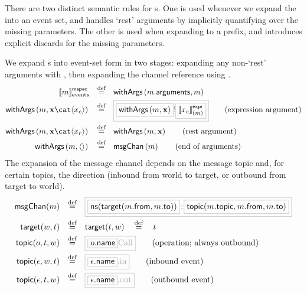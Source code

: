 There are two distinct semantic rules for \mmessagespec s.  One is used whenever
we expand the \mmessagespec{} into an event set, and handles `rest' arguments
by implicitly quantifying over the missing parameters.  The other is used when
expanding to a prefix, and introduces explicit discards for the missing
parameters.  

\begin{defn}

We expand \mmessagespec s into event-set form in two stages: expanding
any non-`rest' arguments with , then expanding the channel
reference using .
%
\begin{align*}
	\emspecsema{\amspec}
\quad\defeq\quad&
\funcname{withArgs}\left(\field{\amspec}{arguments}, \amspec\right)
\\
	\funcname{withArgs}\left(\amspec, \anarglist\cat\langle\anexprarg\rangle\right)
\quad\defeq\quad&
\tlang{
	\olang{\funcname{withArgs}\left(\amspec, \anarglist\right)}
	!\olang{\exprsema{\anexprarg}{\amspec}}
}
\tag{expression argument}
\\
	\funcname{withArgs}\left(\amspec, \anarglist\cat\langle\arestarg\rangle\right)
\quad\defeq\quad&
	\funcname{withArgs}\left(\amspec, \anarglist\right)
\tag{rest argument}
\\
	\funcname{withArgs}\left(\amspec, \langle\rangle\right)
\quad\defeq\quad&
	\funcname{msgChan}\left(\amspec\right)
\tag{end of arguments}
\end{align*}
The expansion of the message channel
depends on the message topic
and, for certain topics, the direction (inbound from world to target, or
outbound from target to world).
\newcommand{\nsOf}[1]{\mathsf{ns}(#1)}
\newcommand{\targetOf}[2]{\mathsf{target}(#1,#2)}
\newcommand{\topicOf}[3]{\mathsf{topic}(#1,#2,#3)}
%
\begin{align*}
	\funcname{msgChan}(\amspec)
\quad\defeq\quad&
\tlang{
	\olang{\nsOf{\targetOf{\field{\amspec}{from}}{\field{\amspec}{to}}}}
	{}\cspnsop{}
	\olang{\topicOf{\field{\amspec}{topic}}{\field{\amspec}{from}}{\field{\amspec}{to}}}
}
\\
	\targetOf{\aworld}{\atarget}
\quad\defeq\quad&
	\targetOf{\atarget}{\aworld}
	\quad\defeq\quad
	\atarget
\\
	\topicOf{\anop}{\atarget}{\aworld}
\quad\defeq\quad&
\tlang{
	\olang{\field{\anop}{name}}\text{Call}
}
\tag{operation; always outbound}
\\
	\topicOf{\anevent}{\aworld}{\atarget}
\quad\defeq\quad&
	\tlang{\olang{\field{\anevent}{name}}\text{.in}}
\tag{inbound event}
\\
	\topicOf{\anevent}{\atarget}{\aworld}
\quad\defeq\quad&
	\tlang{\olang{\field{\anevent}{name}}\text{.out}}
\tag{outbound event}
\end{align*}
\end{defn}

